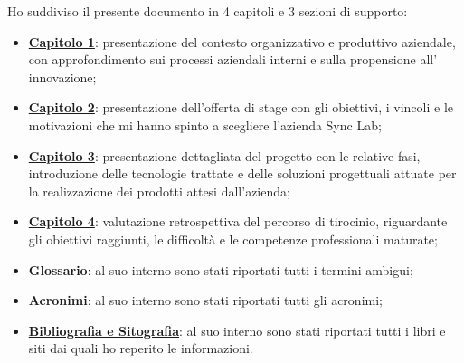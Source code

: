 \noindent Ho suddiviso il presente documento in 4 capitoli e 3 sezioni di supporto:
\begin{itemize}
  \item \hyperref[cap:contesto-aziendale]{\textbf{Capitolo 1}}: presentazione del contesto organizzativo e produttivo aziendale, con approfondimento sui processi aziendali interni e sulla propensione all' innovazione;

  \item \hyperref[cap:stage]{\textbf{Capitolo 2}}: presentazione dell'offerta di stage con gli obiettivi, i vincoli e le motivazioni che mi hanno spinto a scegliere l'azienda Sync Lab; 
  
  \item \hyperref[cap:nftlab]{\textbf{Capitolo 3}}: presentazione dettagliata del progetto con le relative fasi, introduzione delle tecnologie trattate e delle soluzioni progettuali attuate per la realizzazione dei prodotti attesi dall'azienda;
  
  \item \hyperref[cap:valutazione-finale]{\textbf{Capitolo 4}}: valutazione retrospettiva del percorso di tirocinio, riguardante gli obiettivi raggiunti, le difficoltà e le competenze professionali maturate;
  
  \item \textbf{Glossario}: al suo interno sono stati riportati tutti i termini ambigui;
  
  \item \textbf{Acronimi}: al suo interno sono stati riportati tutti gli acronimi;

  \item \hyperref[cap:bibliografia-sitografia]{\textbf{Bibliografia e Sitografia}}: al suo interno sono stati riportati tutti i libri e siti dai quali ho reperito le informazioni.
\end{itemize}

%
%

\endgroup

\vfill

